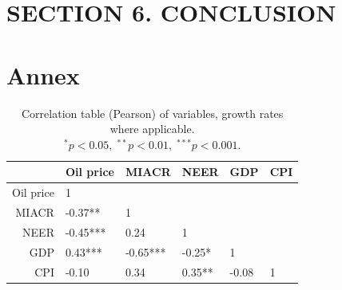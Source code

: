 \documentclass[12pt, a4paper]{extarticle}
\begin{document}
\clearpage
\section*{SECTION 6. CONCLUSION}




\renewcommand*{\newblockpunct}{\addperiod\space\bibsentence}
\newpage
\linespread{1.3}

\printbibliography
{}
\newpage
\setcounter{figure}{0}
\setcounter{table}{0}
\makeatletter
\renewcommand*{\thetable}{\alph{table}}
\renewcommand*{\thefigure}{\alph{figure}}
\let\c@table\c@figure
\makeatother 

\section*{Annex}
\label{app}

\begin{table}[h!]
\centering
	\begin{tabular}{@{}rlllll@{}}
	  \toprule
	 & Oil price & MIACR & NEER & GDP & CPI \\ 
	  \midrule
	 	Oil price & 1 &  &  &  &\\ 
  		MIACR& -0.37**  & 1 &  &  & \\ 
  		NEER & -0.45*** & 0.24  &  1  & & \\ 
  		GDP &  0.43***  &  -0.65*** & -0.25* & 1 & \\ 
  		CPI & -0.10  & 0.34  &  0.35** &  -0.08 & 1 \\ 
	   \bottomrule
	\end{tabular}
	\caption{Correlation table (Pearson) of variables, growth rates where applicable.\\ $^*p<0.05,\; ^{**}p<0.01,\;^{***}p<0.001$.}
	\label{table:correlation_variables}
\end{table}
\end{document}
